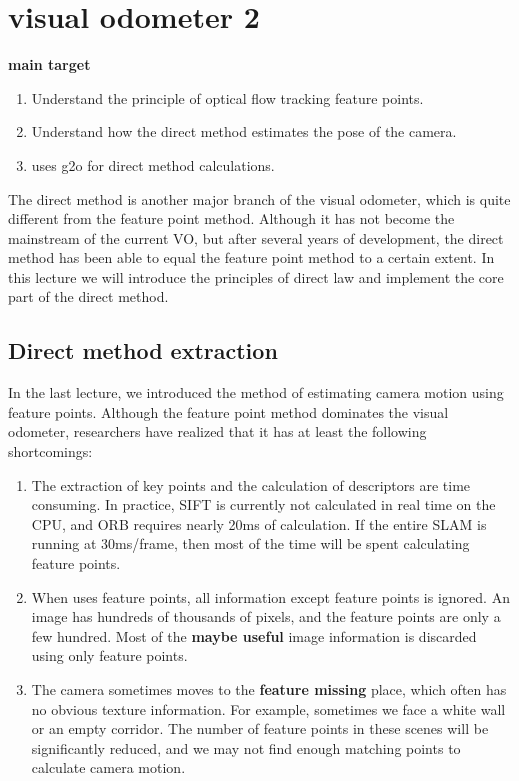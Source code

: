 \chapter{visual odometer 2}
\label{cpt:vo2}
\begin{mdframed}
\textbf{main target}
\begin{enumerate}[labelindent=0em,leftmargin=1.5em]
\item Understand the principle of optical flow tracking feature points.
\item Understand how the direct method estimates the pose of the camera.
\item uses g2o for direct method calculations.
\end{enumerate}
\end{mdframed}

The direct method is another major branch of the visual odometer, which is quite different from the feature point method. Although it has not become the mainstream of the current VO, but after several years of development, the direct method has been able to equal the feature point method to a certain extent. In this lecture we will introduce the principles of direct law and implement the core part of the direct method.

\newpage


\newpage
\section{Direct method extraction}
In the last lecture, we introduced the method of estimating camera motion using feature points. Although the feature point method dominates the visual odometer, researchers have realized that it has at least the following shortcomings:

\begin{enumerate}
\item The extraction of key points and the calculation of descriptors are time consuming. In practice, SIFT is currently not calculated in real time on the CPU, and ORB requires nearly 20ms of calculation. If the entire SLAM is running at 30ms/frame, then most of the time will be spent calculating feature points.

\item When uses feature points, all information except feature points is ignored. An image has hundreds of thousands of pixels, and the feature points are only a few hundred. Most of the \textbf{maybe useful} image information is discarded using only feature points.

\item The camera sometimes moves to the \textbf{feature missing} place, which often has no obvious texture information. For example, sometimes we face a white wall or an empty corridor. The number of feature points in these scenes will be significantly reduced, and we may not find enough matching points to calculate camera motion.
\end{enumerate}

